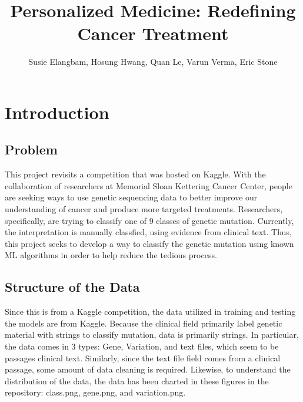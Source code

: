 \documentclass{article}
\title{Personalized Medicine: Redefining Cancer Treatment}
\author{Susie Elangbam, Hosung Hwang, Quan Le, Varun Verma, Eric Stone}
\begin{document}
    \maketitle
    
    \iffalse
    this won't appear in the final pdf.  just a reminder for anyone contributing.  
    REQUIREMENTS (verbatim as written in the doc)
    At a minimum, your final report must 
    describe the problem/application and motivation, survey related work, discuss your approach, and explain your
    results/conclusions/impact of your project. It should include enough detail such that someone else can reproduce
    your method and results. You are also required to provide a link to a GitHub repository where your code is stored.
    SUBMITTING DETAILS
    Save your report as a PDF file of 5 pages or less. Again, The corresponding member of the team should submit
    the final PDF and the GitHub link through Sakai by the announced deadline.
    \fi
    
    \section{Introduction}
    \subsection{Problem}
    This project revisits a competition that was hosted on Kaggle.  With the collaboration of researchers at Memorial Sloan Kettering Cancer Center, people are seeking ways to use genetic sequencing data to better improve our understanding of cancer and produce more targeted treatments.  Researchers, specifically, are trying to classify one of 9 classes of genetic mutation.  Currently, the interpretation is manually classfied, using evidence from clinical text. Thus, this project seeks to develop a way to classify the genetic mutation using known ML algorithms in order to help reduce the tedious process. 
    \subsection{Structure of the Data}
    Since this is from a Kaggle competition, the data utilized in training and testing the models are from Kaggle.  Because the clinical field primarily label genetic material with strings to classify mutation, data is primarily strings. In particular, the data comes in 3 types: Gene, Variation, and text files, which seem to be passages clinical text.  Similarly, since the text file field comes from a clinical passage, some amount of data cleaning is required.  Likewise, to understand the distribution of the data, the data has been charted in these figures in the repository: class.png, gene.png, and variation.png.  
\end{document}
